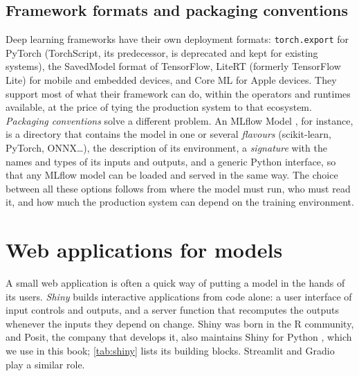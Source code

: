 \subsection{Framework formats and packaging conventions}

Deep learning frameworks have their own deployment formats: \texttt{torch.export} for PyTorch (TorchScript, its
predecessor, is deprecated and kept for existing systems), the SavedModel format of TensorFlow, LiteRT (formerly TensorFlow Lite) for mobile and embedded
devices, and Core ML for Apple devices. They support most of what their framework can do, within the operators and runtimes available, at the
price of
tying the production system to that ecosystem. \emph{Packaging conventions} solve a different problem.
An MLflow Model \citep{zaharia2018accelerating}, for instance, is a directory that contains the model in
one or several \emph{flavours} (scikit-learn, PyTorch, ONNX\dots), the description of its environment,
a \emph{signature} with the names and types of its inputs and outputs, and a generic Python interface, so
that any MLflow model can be loaded and served in the same way. The choice between all these options
follows from where the model must run, who must read it, and how much the production system can depend on
the training environment.

\section{Web applications for models}\label{sec:webapps}

A small web application is often a quick way of putting a model in the hands of its users.
\emph{Shiny} \citep{shiny2012} builds interactive applications from code alone: a user interface of input
controls and outputs, and a server function that recomputes the outputs whenever the inputs they depend on
change. Shiny was born in the R community, and Posit, the company that develops it, also maintains Shiny for
Python \citep{shinypython2024}, which we use in this book; \cref{tab:shiny} lists its building blocks. Streamlit
and Gradio play a similar role.


